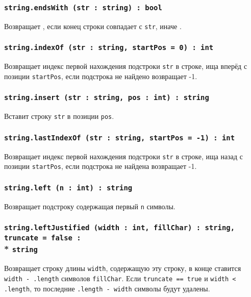 \subsubsection{\texttt{string.endsWith (str : string) : bool}}

Возвращает \true{}, если конец строки совпадает с \texttt{str}, иначе \false{}.

\subsubsection{\texttt{string.indexOf (str : string, startPos = 0) : int}}

Возвращает индекс первой нахождения подстроки \texttt{str} в строке, ища вперёд с позиции \texttt{startPos}, если подстрока не найдено возвращает -1.

\subsubsection{\texttt{string.insert (str : string, pos : int) : string}}

Вставит строку \texttt{str} в позиции \texttt{pos}.

\subsubsection{\texttt{string.lastIndexOf (str : string, startPos = -1) : int}}

Возвращает индекс первой нахождения подстроки \texttt{str} в строке, ища назад с позиции \texttt{startPos}, если подстрока не найдена возвращает -1.

\subsubsection{\texttt{string.left (n : int) : string}}

Возвращает подстроку содержащая первый \texttt{n} символы.

\subsubsection{\texttt{string.leftJustified (width : int, fillChar) : string, truncate = false :}\\* \texttt{string}}

Возвращает строку длины \texttt{width}, содержащую эту строку, в конце ставится \texttt{width - .length} символов \texttt{fillChar}. Если \texttt{truncate == true} и \texttt{width < .length}, то последние \texttt{.length - width} символы будут удалены.

